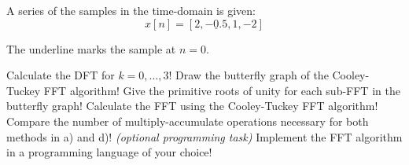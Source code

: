 \begin{solution}
	\begin{tasks}
	\end{tasks}
\end{solution}


\begin{question}[subtitle={FFT}]
	A series of the samples in the time-domain is given:
	\begin{equation*}
		x[n] = \left[2, \underline{-0.5}, 1, -2 \right]
	\end{equation*}
	
	\begin{remark}
		The underline marks the sample at $n = 0$.
	\end{remark}
	
	\begin{tasks}
		\task
		Calculate the DFT for $k = 0, \ldots, 3$!
		\task
		Draw the butterfly graph of the Cooley-Tuckey FFT algorithm!
		\task
		Give the primitive roots of unity for each sub-FFT in the butterfly graph!
		\task
		Calculate the FFT using the Cooley-Tuckey FFT algorithm!
		\task
		Compare the number of multiply-accumulate operations necessary for both methods in a) and d)!
		\task
		\textit{(optional programming task)} Implement the FFT algorithm in a programming language of your choice!
	\end{tasks}
\end{question}

\begin{solution}
	\begin{tasks}
	\end{tasks}
\end{solution}

%
